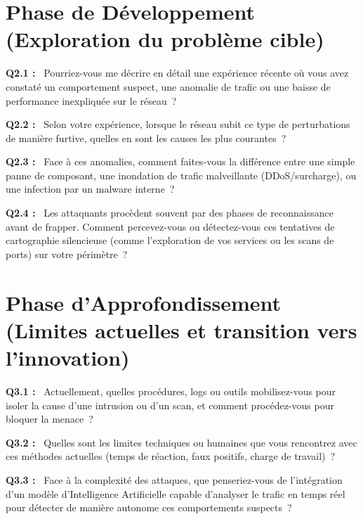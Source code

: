 \documentclass[12pt,a4paper]{article}
\newcommand{\og}{\guillemotleft\,}
\newcommand{\fg}{\,\guillemotright}
\begin{document}
\section{Phase de D\'{e}veloppement (Exploration du probl\`{e}me cible)}

\textbf{Q2.1 :} \og{} Pourriez-vous me d\'{e}crire en d\'{e}tail une exp\'{e}rience r\'{e}cente o\`{u} vous avez constat\'{e}
un comportement suspect, une anomalie de trafic ou une baisse de performance inexpliquée
sur le r\'{e}seau~? \fg{}

\bigskip

\textbf{Q2.2 :} \og{} Selon votre exp\'{e}rience, lorsque le r\'{e}seau subit ce type de perturbations de mani\`{e}re
furtive, quelles en sont les causes les plus courantes~? \fg{}

\bigskip

\textbf{Q2.3 :} \og{} Face \`{a} ces anomalies, comment faites-vous la diff\'{e}rence entre une simple panne de
composant, une inondation de trafic malveillante (DDoS/surcharge), ou une infection par
un malware interne~? \fg{}

\bigskip

\textbf{Q2.4 :} \og{} Les attaquants proc\`{e}dent souvent par des phases de reconnaissance avant de frapper.
Comment percevez-vous ou d\'{e}tectez-vous ces tentatives de cartographie silencieuse
(comme l'exploration de vos services ou les scans de ports) sur votre p\'{e}rim\`{e}tre~? \fg{}

\section{Phase d'Approfondissement (Limites actuelles et transition vers l'innovation)}

\textbf{Q3.1 :} \og{} Actuellement, quelles proc\'{e}dures, logs ou outils mobilisez-vous pour isoler la cause
d'une intrusion ou d'un scan, et comment proc\'{e}dez-vous pour bloquer la menace~? \fg{}

\bigskip

\textbf{Q3.2 :} \og{} Quelles sont les limites techniques ou humaines que vous rencontrez avec ces m\'{e}thodes
actuelles (temps de r\'{e}action, faux positifs, charge de travail)~? \fg{}

\bigskip

\textbf{Q3.3 :} \og{} Face \`{a} la complexit\'{e} des attaques, que penseriez-vous de l'int\'{e}gration d'un mod\`{e}le
d'Intelligence Artificielle capable d'analyser le trafic en temps r\'{e}el pour d\'{e}tecter de
mani\`{e}re autonome ces comportements suspects~? \fg{}
\end{document}
